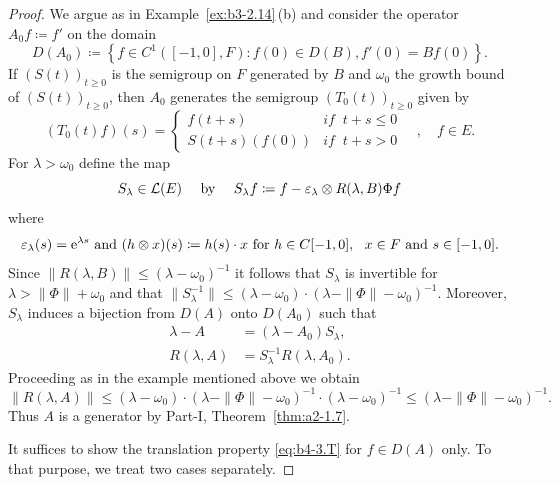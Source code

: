 \begin{proof} 
We argue as in Example~\ref{ex:b3-2.14}\,(b) and consider the operator $A_{0}f  \coloneq  f'$ on the domain 
\[
D(A_{0})  \coloneq  \left\{f \in C^1([-1,0],F) \colon f(0) \in D(B), f'(0) = Bf(0)\right\} .
\]
If\/ $(S(t))_{t\geq 0}$ is the semigroup on $F$ generated by $B$ and $\omega_0$ the growth bound of\/ $(S(t))_{t\geq 0}$, then $A_{0}$ generates the semigroup $(T_{0}(t))_{t\geq 0}$ given by
\[
(T_{0}(t)f)(s) = \begin{cases}
	f(t+s) & \textit{if } \ t+s \leq 0 \\
	S(t+s)(f(0)) & \textit{if } \ t+s  >  0
\end{cases}\quad, \quad f \in E .
\]
For $\lambda  >  \omega_0$ define the map 
\[
S_{\lambda} \in \LE
\quad\text{ by }\quad  
S_{\lambda}f  \coloneq  f - \epsilon_{\lambda}\otimes R(\lambda,B)\Phi f
\]
 where 
\[
\epsilon_{\lambda}(s) = \eu^{\lambda s}
\text{ and } 
(h\otimes x)(s)  \coloneq  h(s)\cdot x
\text{ for }
h \in C[-1,0]
,\ \ 
x \in F
\text{ and }
s \in [-1,0]
.
\]
Since $\|R(\lambda,B)\| \leq (\lambda-\omega_0)^{-1}$ it follows that $S_{\lambda}$ is invertible for $\lambda  >  \|\Phi\| + \omega_0$ and that $\|S_{\lambda}^{-1}\| \leq (\lambda-\omega_0)\cdot(\lambda-\|\Phi\|-\omega_0)^{-1}$.
Moreover, $S_{\lambda}$ induces a bijection from $D(A)$ onto $D(A_{0})$ such that
\begin{equation}\label{eq:b4-3.2}
	\begin{aligned}
		\lambda - A &= (\lambda - A_{0})S_{\lambda} , \\
		R(\lambda,A) &= S_{\lambda}^{-1}R(\lambda,A_{0}) .
	\end{aligned}
\end{equation}
Proceeding as in the example mentioned above we obtain
\[\|R(\lambda,A)\| \leq (\lambda - \omega_0)\cdot(\lambda - \|\Phi\| - \omega_0)^{-1}\cdot(\lambda - \omega_0)^{-1} \leq (\lambda - \|\Phi\| - \omega_0)^{-1}.\]
Thus $A$ is a generator by Part-I, Theorem~\ref{thm:a2-1.7}.

It suffices to show the translation property \eqref{eq:b4-3.T} for $f \in D(A)$ only.
To that purpose, we treat two cases separately.


\end{proof}
